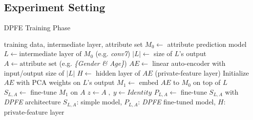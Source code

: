 \documentclass[10pt,journal,compsoc]{IEEEtran}
\begin{document}
\subsection{Experiment Setting}\begin{algorithm}[t] 
	\caption{DPFE Training Phase}
	\label{alg:train}
	\begin{algorithmic}
		\REQUIRE training data, intermediate layer, attribute set %
		\STATE $M_0 \leftarrow$ attribute prediction model
		\STATE $L \leftarrow \text{intermediate layer of } M_0$ (e.g. \emph{conv7})
		\STATE $|L| \leftarrow$ size of $L$'s output
		\STATE $A \leftarrow \text{attribute set}$ (e.g. \emph{\{Gender \& Age\}})
		\STATE $AE \leftarrow$ linear auto-encoder with input/output size of $|L|$
		\STATE $H \leftarrow$ hidden layer of $AE$ (private-feature layer)
		\STATE Initialize $AE$ with PCA weights on $L$'s output 
		\STATE $M_1 \leftarrow$ embed $AE$ to $M_0$ on top of $L$
		\STATE $S_{L,A} \leftarrow$ fine-tune $M_1$ on $A$
		\STATE $z \leftarrow A\;,\; y \leftarrow Identity$
		\STATE $P_{L,A} \leftarrow$ fine-tune $S_{L,A}$ with \emph{DPFE} architecture
		\ENSURE $S_{L,A}$: simple model, $P_{L,A}$: \emph{DPFE} fine-tuned model, $H$: private-feature layer
	\end{algorithmic}
\end{algorithm}
\end{document}
